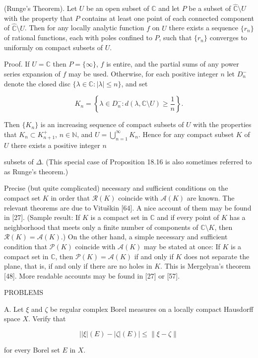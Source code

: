 (Runge’s Theorem). Let $U$ be an open subset of $\mathbb{C}$ and let $P$ be a subset of $\hat{\mathbb{C}} \setminus U$ with the property that $P$ contains at least one point of each connected component of $\hat{\mathbb{C}} \setminus U$. Then for any locally analytic function $f$ on $U$ there exists a sequence $\{r_n\}$ of rational functions, each with poles confined to $P$, such that $\{r_n\}$ converges to uniformly on compact subsets of $U$.

Proof. If $U = \mathbb{C}$ then $P = \{\infty\}$, $f$ is entire, and the partial sums of any power series expansion of $f$ may be used. Otherwise, for each positive integer $n$ let $D_n^-$ denote the closed disc $\{\lambda \in \mathbb{C}: |\lambda| \leq n\}$, and set

$$K_n = \left\{ \lambda \in D_n^- : d(\lambda, \mathbb{C} \setminus U) \geq \frac{1}{n} \right\}.$$

Then $\{K_n\}$ is an increasing sequence of compact subsets of $U$ with the properties that $K_n \subset K_{n+1}^+$, $n \in \mathbb{N}$, and $U = \bigcup_{n=1}^{\infty} K_n$. Hence for any compact subset $K$ of $U$ there exists a positive integer $n$

subsets of $\Delta$. (This special case of Proposition 18.16 is also sometimes referred to as Runge’s theorem.)

Precise (but quite complicated) necessary and sufficient conditions on the compact set $K$ in order that $\mathcal{R}(K)$ coincide with $\mathcal{A}(K)$ are known. The relevant theorems are due to Vituškin [64]. A nice account of them may be found in [27]. (Sample result: If $K$ is a compact set in $\mathbb{C}$ and if every point of $K$ has a neighborhood that meets only a finite number of components of $\mathbb{C} \setminus K$, then $\mathcal{R}(K) = \mathcal{A}(K)$.) On the other hand, a simple necessary and sufficient condition that $\mathcal{P}(K)$ coincide with $\mathcal{A}(K)$ may be stated at once: If $K$ is a compact set in $\mathbb{C}$, then $\mathcal{P}(K) = \mathcal{A}(K)$ if and only if $K$ does not separate the plane, that is, if and only if there are no holes in $K$. This is Mergelyan’s theorem [48]. More readable accounts may be found in [27] or [57].

PROBLEMS

A. Let $\xi$ and $\zeta$ be regular complex Borel measures on a locally compact Hausdorff space $X$. Verify that

$$||\xi|(E) - |\zeta|(E)| \leq \|\xi - \zeta\|$$

for every Borel set $E$ in $X$.

